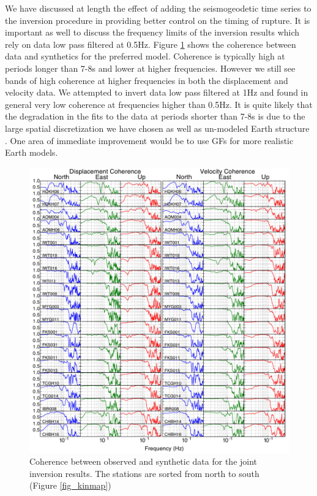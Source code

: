 We have discussed at length the effect of adding the seismogeodetic time series to the inversion procedure in providing better control on the timing of rupture. It is important as well to discuss the frequency limits of the inversion results which rely on data low pass filtered at 0.5Hz. Figure \ref{fig_coherence} shows the coherence between data and synthetics for the preferred model. Coherence is typically high at periods longer than 7-8s and lower at higher frequencies. However we still see bands of high coherence at higher frequencies in both the displacement and velocity data. We attempted to invert data low pass filtered at 1Hz and found in general very low coherence at frequencies higher than 0.5Hz. It is quite likely that the degradation in the fits to the data at periods shorter than 7-8s is due to the large spatial discretization we have chosen as well as un-modeled Earth structure \citep{graves2001,wald2001}. One area of immediate improvement would be to use GFs for more realistic Earth models. 

\begin{figure}[!ht] 
  \centering
  \includegraphics[width=0.99\linewidth]{./figures/ch4/all_coherence.pdf}
    \caption[Coherence plots]{Coherence between observed and synthetic data for the joint inversion results. The stations are sorted from north to south (Figure \ref{fig_kinmap})}
  \label{fig_coherence}
\end{figure}

